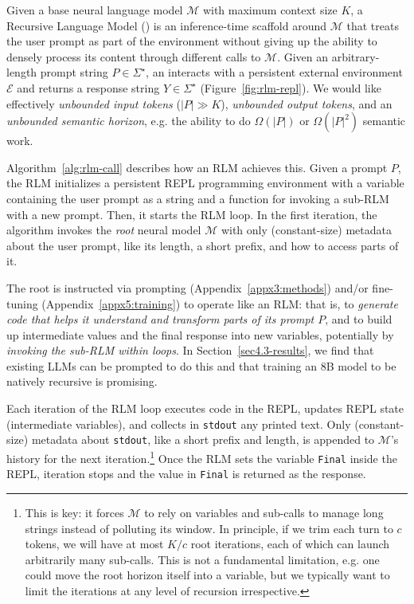 Given a base neural language model $\mathcal{M}$ with maximum context size $K$, a Recursive Language Model (\RLM{}) is an inference-time scaffold around $\mathcal{M}$ that treats the user prompt as part of the environment without giving up the ability to densely process its content through different calls to $\mathcal{M}$.
Given an arbitrary-length prompt string $P\in\Sigma^\star$, an \RLM{} interacts with a persistent external environment $\mathcal{E}$ and returns a response string $Y\in\Sigma^\star$ (Figure~\ref{fig:rlm-repl}).
We would like effectively \emph{unbounded input tokens} ($|P|\gg K$), \emph{unbounded output tokens}, and an \emph{unbounded semantic horizon}, e.g. the ability to do $\Omega(|P|)$ or $\Omega(|P|^2)$ semantic work.

Algorithm~\ref{alg:rlm-call} describes how an RLM achieves this. Given a prompt $P$, the RLM initializes a persistent REPL programming environment with a variable containing the user prompt as a string and a function for invoking a sub-RLM with a new prompt. Then, it starts the RLM loop. In the first iteration, the algorithm invokes the \textit{root} neural model $\mathcal{M}$ with only (constant-size) metadata about the user prompt, like its length, a short prefix, and how to access parts of it.

The root is instructed via prompting (Appendix~\ref{appx3:methods}) and/or fine-tuning (Appendix~\ref{appx5:training}) to operate like an RLM: that is, to \textit{generate code that helps it understand and transform parts of its prompt $P$}, and to build up intermediate values and the final response into new variables, potentially by \textit{invoking the sub-RLM within loops}. In Section~\ref{sec4.3-results}, we find that existing LLMs can be prompted to do this and that training an 8B model to be natively recursive is promising.

Each iteration of the RLM loop executes code in the REPL, updates REPL state (intermediate variables), and collects in \texttt{stdout} any printed text. Only (constant-size) metadata about \texttt{stdout}, like a short prefix and length, is appended to $\mathcal{M}$'s history for the next iteration.\footnote{This is key: it forces $\mathcal{M}$ to rely on variables and sub-calls to manage long strings instead of polluting its window. In principle, if we trim each turn to $c$ tokens, we will have at most $K/c$ root iterations, each of which can launch arbitrarily many sub-calls. This is not a fundamental limitation, e.g. one could move the root horizon itself into a variable, but we typically want to limit the iterations at any level of recursion irrespective.} Once the RLM sets the variable \texttt{Final} inside the REPL, iteration stops and the value in \texttt{Final} is returned as the response.


